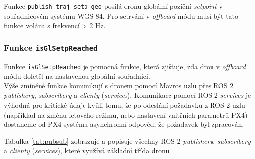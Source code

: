 Funkce \texttt{publish\_traj\_setp\_geo} posílá dronu globální poziční \textit{setpoint} v souřadnicovém systému WGS 84. Pro setrvání v \textit{offboard} módu musí být tato funkce volána s frekvencí > 2 Hz.

\subsubsection{Funkce \texttt{isGlSetpReached}}

Funkce \texttt{isGlSetpReached} je pomocná funkce, která zjišťuje, zda dron v \textit{offboard} módu doletěl na nastavenou globální souřadnici.\\

Výše zmíněné funkce komunikují s dronem pomocí Mavros uzlu přes ROS 2 \textit{publishery}, \textit{subscribery} a \textit{clienty} (\textit{services}). Komunikace pomocí ROS 2 \textit{services} je výhodná pro kritické údaje kvůli tomu, že po odeslání požadavku z ROS 2 uzlu (například na změnu letového režimu, nebo nastavení vnitřních parametrů PX4) dostaneme od PX4 systému asynchronní odpověď, že požadavek byl zpracován.

Tabulka \ref{tab:pubsub} zobrazuje a popisuje všechny ROS 2 \textit{publishery}, \textit{subscribery} a \textit{clienty} (\textit{services}), které využívá základní třída dronu.


